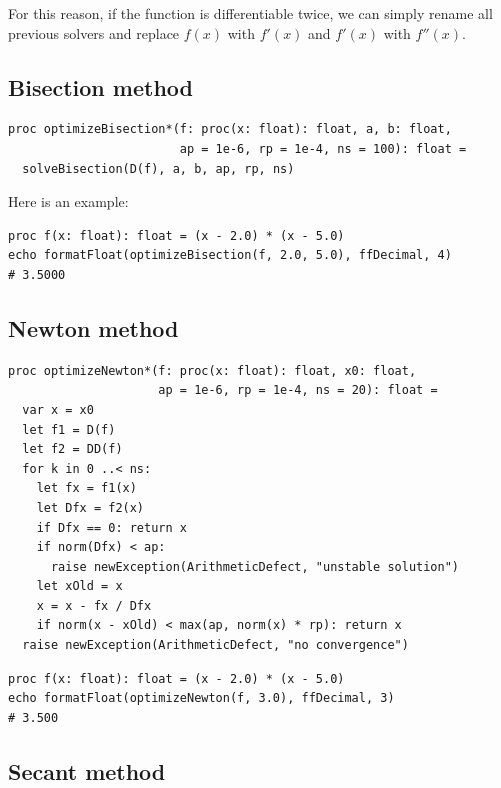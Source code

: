 \documentclass[justified, sixbynine]{tufte-book}
\def\ft{\small\tt}
\theoremstyle{plain}%
\newtheorem * {corollary}{Corollary}
\theoremstyle{definition}
\theoremstyle{remark}
\newtheorem * {remark}{Remark}
\newtheorem * {note}{Note}
\begin{document}
\begin{fullwidth}
For this reason, if the function is differentiable twice, we can simply rename all previous solvers and replace $f(x)$ with $f'(x)$ and $f'(x)$ with $f''(x)$.

\goodbreak\subsection{Bisection method}


\begin{lstlisting}[caption={in file: {\ft nlib/solvers.nim}}]
proc optimizeBisection*(f: proc(x: float): float, a, b: float,
                        ap = 1e-6, rp = 1e-4, ns = 100): float =
  solveBisection(D(f), a, b, ap, rp, ns)
\end{lstlisting}

Here is an example:

\begin{lstlisting}
proc f(x: float): float = (x - 2.0) * (x - 5.0)
echo formatFloat(optimizeBisection(f, 2.0, 5.0), ffDecimal, 4)
# 3.5000
\end{lstlisting}

\goodbreak\subsection{Newton method}


\begin{lstlisting}[caption={in file: {\ft nlib/solvers.nim}}]
proc optimizeNewton*(f: proc(x: float): float, x0: float,
                     ap = 1e-6, rp = 1e-4, ns = 20): float =
  var x = x0
  let f1 = D(f)
  let f2 = DD(f)
  for k in 0 ..< ns:
    let fx = f1(x)
    let Dfx = f2(x)
    if Dfx == 0: return x
    if norm(Dfx) < ap:
      raise newException(ArithmeticDefect, "unstable solution")
    let xOld = x
    x = x - fx / Dfx
    if norm(x - xOld) < max(ap, norm(x) * rp): return x
  raise newException(ArithmeticDefect, "no convergence")
\end{lstlisting}

\begin{lstlisting}
proc f(x: float): float = (x - 2.0) * (x - 5.0)
echo formatFloat(optimizeNewton(f, 3.0), ffDecimal, 3)
# 3.500
\end{lstlisting}

\goodbreak\subsection{Secant method}


\end{fullwidth}
\end{document}
